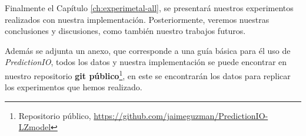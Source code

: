 Finalmente el Capítulo \ref{ch:experimetal-all}, se presentará nuestros experimentos realizados con nuestra implementación. Posteriormente, veremos nuestras conclusiones y discusiones, como también nuestro trabajos futuros.





Además se adjunta un anexo, que corresponde a una guía básica para él uso de \emph{PredictionIO}, todos los datos y nuestra implementación se puede encontrar en nuestro repositorio \textbf{git público}\footnote{Repositorio público, \url{https://github.com/jaimeguzman/PredictionIO-LZmodel}}, en este se encontrarán los datos para replicar los experimentos que hemos realizado. 



